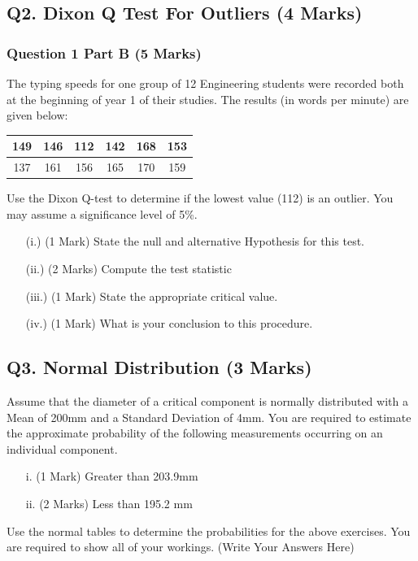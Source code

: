 \documentclass[a4paper,12pt]{article}
\begin{document}
\subsection*{Q2. Dixon Q Test For Outliers (4 Marks)}

\subsubsection*{Question 1 Part B (5 Marks)}

The typing speeds for one group of 12 Engineering students were recorded both at the beginning of year 1 of their studies. The results (in words per minute) are given below:

\begin{center}
	\begin{tabular}{|c|c|c|c|c|c|}
		\hline
		149  & 146 & 112 & 142 & 168& 153\\ \hline
		137 & 161 & 156& 165&  170&  159
		\\ \hline
	\end{tabular}
\end{center}
Use the Dixon Q-test to determine if the lowest value (112) is an outlier. You may assume a significance level of 5\%.
\begin{itemize}
	\item[(i.)](1 Mark)	State the null and alternative Hypothesis for this test.
	\item[(ii.)](2 Marks) Compute the test statistic
	\item[(iii.)](1 Mark) State the appropriate critical value.
	\item[(iv.)](1 Mark) What is your conclusion to this procedure.
\end{itemize}
\newpage



\subsection*{Q3. Normal Distribution (3 Marks)} %
Assume that the diameter of a critical component is normally distributed with a Mean of 200mm and a Standard Deviation of 4mm. You are required  to estimate the approximate probability of the following measurements occurring on an individual component.
\begin{itemize}
	\item[i.](1 Mark)	Greater than 203.9mm
	\item[ii.](2 Marks) Less than 195.2 mm
\end{itemize}
\bigskip
\noindent Use the normal tables to determine the probabilities for the above exercises. You are required to show all of your workings.
\newpage
(Write Your Answers Here)
\newpage
\vspace{0.25cm}
\end{document}
